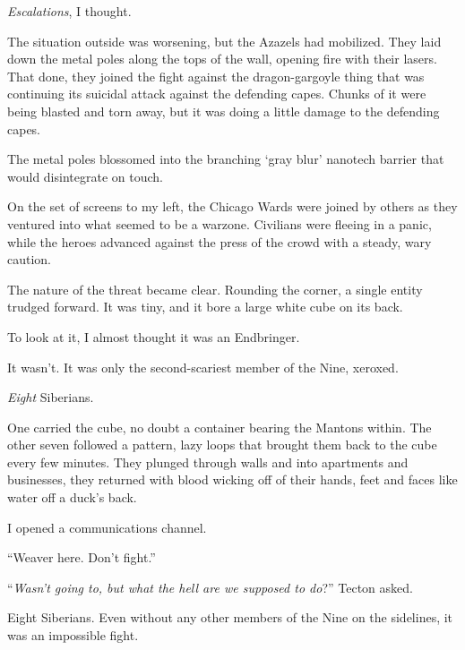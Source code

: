 \emph{Escalations}, I thought.



The situation outside was worsening, but the Azazels had mobilized.  They laid down the metal poles along the tops of the wall, opening fire with their lasers.  That done, they joined the fight against the dragon-gargoyle thing that was continuing its suicidal attack against the defending capes.  Chunks of it were being blasted and torn away, but it was doing a little damage to the defending capes.



The metal poles blossomed into the branching `gray blur' nanotech barrier that would disintegrate on touch.



On the set of screens to my left, the Chicago Wards were joined by others as they ventured into what seemed to be a warzone.  Civilians were fleeing in a panic, while the heroes advanced against the press of the crowd with a steady, wary caution.



The nature of the threat became clear.  Rounding the corner, a single entity trudged forward.  It was tiny, and it bore a large white cube on its back.



To look at it, I almost thought it was an Endbringer.



It wasn't.  It was only the second-scariest member of the Nine, xeroxed.



\emph{Eight} Siberians.



One carried the cube, no doubt a container bearing the Mantons within.  The other seven followed a pattern, lazy loops that brought them back to the cube every few minutes.  They plunged through walls and into apartments and businesses, they returned with blood wicking off of their hands, feet and faces like water off a duck's back.



I opened a communications channel.



``Weaver here.  Don't fight.''



``\emph{Wasn't going to, but what the hell are we supposed to do}?'' Tecton asked.



Eight Siberians.  Even without any other members of the Nine on the sidelines, it was an impossible fight.




